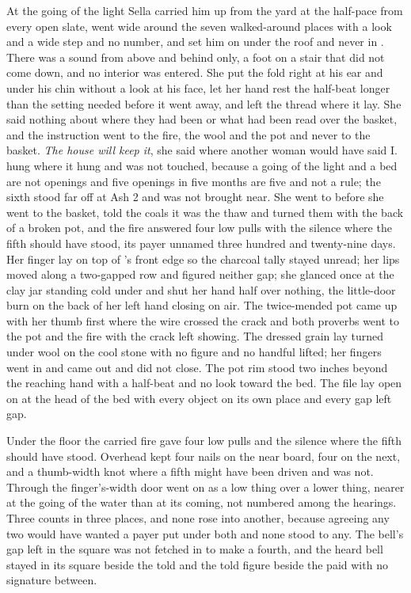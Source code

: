 \scenebreak

At the going of the light Sella carried him up from the yard at the half-pace from every open slate, went wide around the seven walked-around places with a look and a wide step and no number, and set him on  under the roof and never in . There was a sound from above and behind only, a foot on a stair that did not come down, and no interior was entered. She put the fold right at his ear and under his chin without a look at his face, let her hand rest the half-beat longer than the setting needed before it went away, and left the thread where it lay. She said nothing about where they had been or what had been read over the basket, and the instruction went to the fire, the wool and the pot and never to the basket. \emph{The house will keep it}, she said where another woman would have said I.  hung where it hung and was not touched, because a going of the light and a bed are not openings and five openings in five months are five and not a rule; the sixth stood far off at Ash 2 and was not brought near. She went to  before she went to the basket, told the coals it was the thaw and turned them with the back of a broken pot, and the fire answered four low pulls with the silence where the fifth should have stood, its payer unnamed three hundred and twenty-nine days. Her finger lay on top of 's front edge so the charcoal tally stayed unread; her lips moved along a two-gapped row and figured neither gap; she glanced once at the clay jar standing cold under  and shut her hand half over nothing, the little-door burn on the back of her left hand closing on air. The twice-mended pot came up with her thumb first where the wire crossed the crack and both proverbs went to the pot and the fire with the crack left showing. The dressed grain lay turned under wool on the cool stone with no figure and no handful lifted; her fingers went in and came out and did not close. The pot rim stood two inches beyond the reaching hand with a half-beat and no look toward the bed. The file lay open on  at the head of the bed with every object on its own place and every gap left gap.

Under the floor the carried fire gave four low pulls and the silence where the fifth should have stood. Overhead  kept four nails on the near board, four on the next, and a thumb-width knot where a fifth might have been driven and was not. Through the finger's-width door  went on as a low thing over a lower thing, nearer at the going of the water than at its coming, not numbered among the hearings. Three counts in three places, and none rose into another, because agreeing any two would have wanted a payer put under both and none stood to any. The bell's gap left in the square was not fetched in to make a fourth, and the heard bell stayed in its square beside the told and the told figure beside the paid with no signature between.

